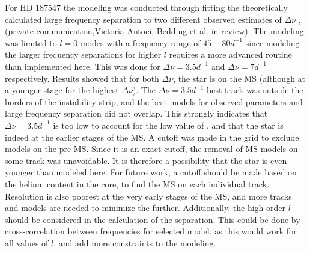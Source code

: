For HD 187547 the modeling was conducted through fitting the theoretically calculated large frequency separation to two different observed estimates of $\Delta\nu$ \citep{antoci2011excitation}, (private communication,Victoria Antoci, Bedding et al. in review). The modeling was limited to $l=0$ modes with a frequency range of $45-80 d^{-1}$ since modeling the larger frequency separations for higher $l$ requires a more advanced routine than implemented here. This was done for $\Delta\nu = 3.5 d^{-1}$ and $\Delta\nu = 7 d^{-1}$ respectively. Results showed that for both $\Delta\nu$, the star is on the MS (although at a younger stage for the highest $\Delta\nu$). The  $\Delta\nu = 3.5 d^{-1}$ best track was outside the borders of the instability strip, and the best models \chis for observed parameters and large frequency separation did not overlap. This strongly indicates that $\Delta\nu = 3.5 d^{-1}$ is too low to account for the low value of \lum, and that the star is indeed at the earlier stages of the MS. A cutoff was made in the grid to exclude models on the pre-MS. Since it is an exact cutoff,  the removal of MS models on some track was unavoidable. It is therefore a possibility that the star is even younger than modeled here. For future work, a cutoff should be made based on the helium content in the core, to find the MS on each individual track. Resolution is also poorest at the very early stages of the MS, and more tracks and models are needed to minimize the \chis further. Additionally, the high order $l$ should be considered in the calculation of the separation. This could be done by cross-correlation between frequencies for selected model, as this would work for all values of $l$, and add more constraints to the modeling. 
